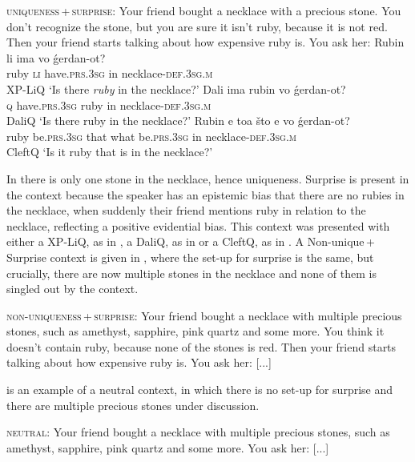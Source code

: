 \documentclass[output=paper,
colorlinks,
citecolor=brown,
newtxmath
]{langscibook}
\begin{document}
\eanoraggedright
\eanoraggedright \textsc{uniqueness\,+\,surprise}: Your friend bought a necklace with a precious stone. You don’t recognize the stone, but you are sure it isn't ruby, because it is not red. Then your friend starts talking about how expensive ruby is. You ask her: \label{unisur}
    \ex \gll Rubin li ima vo ǵerdan-ot? \\
ruby \textsc{li} have.\textsc{prs.3sg} in necklace-\textsc{def.3sg.m} \\ \hfill XP-LiQ
\glt `Is there \emph{ruby} in the necklace?'  \label{rubinli}
    \ex \gll Dali ima rubin vo ǵerdan-ot? \\
\textsc{q} have.\textsc{prs.3sg} ruby in necklace-\textsc{def.3sg.m} \\ \hfill DaliQ
\glt `Is there ruby in the necklace?'  \label{dalirubin}
    \ex \gll Rubin e toa što e vo ǵerdan-ot? \\
ruby be.\textsc{prs.3sg} that what be.\textsc{prs.3sg} in necklace-\textsc{def.3sg.m} \\ \hfill CleftQ
\glt `Is it ruby that is in the necklace?'  \label{cleftrubin}
\z\z

\noindent In  there is only one stone in the necklace, hence uniqueness. Surprise is present in the context because the speaker has an epistemic bias that there are no rubies in the necklace, when suddenly their friend mentions ruby in relation to the necklace, reflecting a positive evidential bias.
This context was presented with either a XP-LiQ, as in , a DaliQ, as in  or a CleftQ, as in . A Non-unique\,+\,Surprise context is given in , where the set-up for surprise is the same, but crucially, there are now multiple stones in the necklace and none of them is singled out by the context.


\eanoraggedright \textsc{non-uniqueness\,+\,surprise:} Your friend bought a necklace with multiple precious stones, such as amethyst, sapphire, pink quartz and some more. You think it doesn't contain ruby, because none of the stones is red. Then your friend starts talking about how expensive ruby is. You ask her: [...] \label{nonunisur}
\z

\noindent
{} is an example of a neutral context, in which there is no set-up for surprise and there are multiple precious stones under discussion.


\eanoraggedright
\textsc{neutral:} Your friend bought a necklace with multiple precious stones, such as amethyst, sapphire, pink quartz and some more. You ask her: [...] \label{neut}
\z
\end{document}
